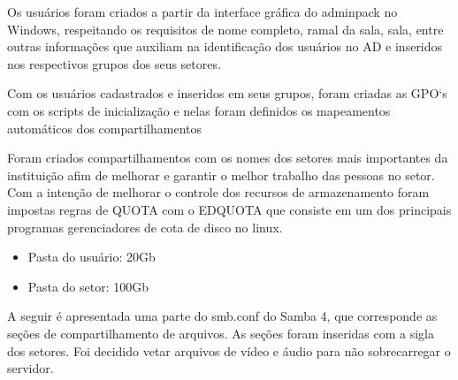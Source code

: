 Os usuários foram criados a partir da interface gráfica do adminpack no Windows, respeitando os requisitos de nome completo, ramal da sala, sala, entre outras informações que auxiliam na identificação dos usuários no AD e inseridos nos respectivos grupos dos seus setores.

Com os usuários cadastrados e inseridos em seus grupos, foram criadas as GPO`s com os scripts de inicialização e nelas foram definidos os mapeamentos automáticos dos compartilhamentos

Foram criados compartilhamentos com os nomes dos setores mais importantes da instituição afim de melhorar e garantir o melhor trabalho das pessoas no setor. Com a intenção de melhorar o controle dos recursos de armazenamento foram impostas regras de QUOTA com o EDQUOTA que consiste em um dos principais programas gerenciadores de cota de disco no linux.

\begin{itemize}
		\item {Pasta do usuário: 20Gb}
		\item {Pasta do setor: 100Gb}
\end{itemize}

A seguir é apresentada uma parte do smb.conf do Samba 4, que corresponde as seções de compartilhamento de arquivos. As seções foram inseridas com a sigla dos setores. Foi decidido vetar arquivos de vídeo e áudio para não sobrecarregar o servidor.\\

